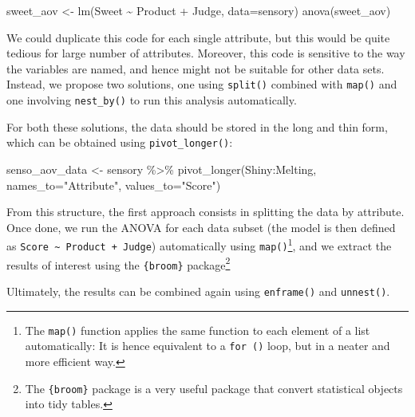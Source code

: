 \documentclass[
]{book}
\newenvironment{Shaded}{\begin{snugshade}}{\end{snugshade}}
\newcommand{\AttributeTok}[1]{\textcolor[rgb]{0.77,0.63,0.00}{#1}}
\newcommand{\FunctionTok}[1]{\textcolor[rgb]{0.00,0.00,0.00}{#1}}
\newcommand{\NormalTok}[1]{#1}
\newcommand{\OtherTok}[1]{\textcolor[rgb]{0.56,0.35,0.01}{#1}}
\newcommand{\SpecialCharTok}[1]{\textcolor[rgb]{0.00,0.00,0.00}{#1}}
\newcommand{\StringTok}[1]{\textcolor[rgb]{0.31,0.60,0.02}{#1}}
\begin{document}
\begin{Shaded}
\begin{Highlighting}[]
\NormalTok{sweet\_aov }\OtherTok{\textless{}{-}} \FunctionTok{lm}\NormalTok{(Sweet }\SpecialCharTok{\textasciitilde{}}\NormalTok{ Product }\SpecialCharTok{+}\NormalTok{ Judge, }\AttributeTok{data=}\NormalTok{sensory)}
\FunctionTok{anova}\NormalTok{(sweet\_aov)}
\end{Highlighting}
\end{Shaded}

We could duplicate this code for each single attribute, but this would be quite tedious for large number of attributes. Moreover, this code is sensitive to the way the variables are named, and hence might not be suitable for other data sets. Instead, we propose two solutions, one using \texttt{split()} combined with \texttt{map()} and one involving \texttt{nest\_by()} to run this analysis automatically.

For both these solutions, the data should be stored in the long and thin form, which can be obtained using \texttt{pivot\_longer()}:

\begin{Shaded}
\begin{Highlighting}[]
\NormalTok{senso\_aov\_data }\OtherTok{\textless{}{-}}\NormalTok{ sensory }\SpecialCharTok{\%\textgreater{}\%} 
  \FunctionTok{pivot\_longer}\NormalTok{(Shiny}\SpecialCharTok{:}\NormalTok{Melting, }\AttributeTok{names\_to=}\StringTok{"Attribute"}\NormalTok{, }\AttributeTok{values\_to=}\StringTok{"Score"}\NormalTok{)}
\end{Highlighting}
\end{Shaded}

From this structure, the first approach consists in splitting the data by attribute. Once done, we run the ANOVA for each data subset (the model is then defined as \texttt{Score\ \textasciitilde{}\ Product\ +\ Judge}) automatically using \texttt{map()}\footnote{The \texttt{map()} function applies the same function to each element of a list automatically: It is hence equivalent to a \texttt{for\ ()} loop, but in a neater and more efficient way.}, and we extract the results of interest using the \texttt{\{broom\}} package\footnote{The \texttt{\{broom\}} package is a very useful package that convert statistical objects into tidy tables.}

Ultimately, the results can be combined again using \texttt{enframe()} and \texttt{unnest()}.
\end{document}
